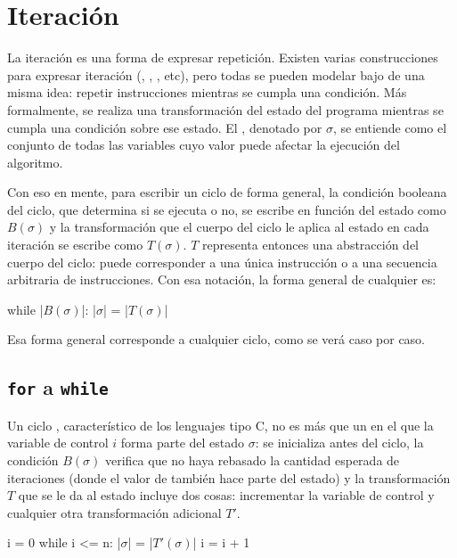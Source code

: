 \section{Iteración} \label{apx:iteracion}

La iteración es una forma de expresar repetición. Existen varias construcciones para expresar iteración (, , , etc), pero todas se pueden modelar bajo de una misma idea: repetir instrucciones mientras se cumpla una condición. Más formalmente, se realiza una transformación del estado del programa mientras se cumpla una condición sobre ese estado. El , denotado por \(\sigma\), se entiende como el conjunto de todas las variables cuyo valor puede afectar la ejecución del algoritmo.

Con eso en mente, para escribir un ciclo de forma general, la condición booleana del ciclo, que determina si se ejecuta o no, se escribe en función del estado como \(B(\sigma)\) y la transformación que el cuerpo del ciclo le aplica al estado en cada iteración se escribe como \(T(\sigma)\). \(T\) representa entonces una abstracción del cuerpo del ciclo: puede corresponder a una única instrucción o a una secuencia arbitraria de instrucciones. Con esa notación, la forma general de cualquier  es:
\begin{pseudocode}
while |\(B(\sigma)\)|:
    |\(\sigma\)| = |\(T(\sigma)\)|
\end{pseudocode}
Esa forma general corresponde a cualquier ciclo, como se verá caso por caso.

\subsection{\texttt{for} a \texttt{while}}

Un ciclo , característico de los lenguajes tipo C, no es más que un  en el que la variable de control \(i\) forma parte del estado \(\sigma\): se inicializa antes del ciclo, la condición \(B(\sigma)\) verifica que no haya rebasado la cantidad esperada de iteraciones (donde el valor de  también hace parte del estado) y la transformación \(T\) que se le da al estado incluye dos cosas: incrementar la variable de control y cualquier otra transformación adicional \(T'\).
\begin{pseudocode}
i = 0
while i <= n:
    |\(\sigma\)| = |\(T'(\sigma)\)|
    i = i + 1
\end{pseudocode}

